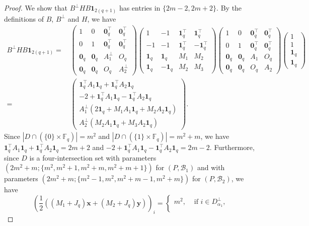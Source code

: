 \documentclass[10pt]{amsart}
\theoremstyle{definition}
\newcommand*\F{{\mathbb F}}
\newcommand*\tra{\top}
\newcommand*{\un}{\mathbf{1}}
\newcommand*{\bfx}{\mathbf{x}}
\newcommand*{\bfy}{\mathbf{y}}
\newcommand*{\bfo}{\mathbf{0}}
\begin{document}
\begin{proof}
We show that $B^\perp H B\un_{2(q+1)}$ has entries in $\{2m-2,2m+2\}$. By the definitions of $B$, $B^\perp$ and $H$, we have
\begin{align*}
B^\perp H B\un_{2(q+1)}=&\,
\begin{pmatrix} 1 &0 & \bfo_q^\tra& \bfo_q^\tra \\
0 &1 & \bfo_q^\tra& \bfo_q^\tra \\
\bfo_q &\bfo_q & A_1^\perp& O_q \\
\bfo_q & \bfo_q &O_q& A_2^\perp
\end{pmatrix}
\begin{pmatrix}
1 &-1 & \un_q^\tra& \un_q^\tra \\
-1 & -1 & \un_q^\tra&-\un_q^\tra \\
\un_q & \un_q &M_1 & M_2 \\
\un_q & -\un_q&M_2 & M_3
\end{pmatrix}
\begin{pmatrix} 1 &0 & \bfo_q^\tra& \bfo_q^\tra \\
0 &1 & \bfo_q^\tra& \bfo_q^\tra \\
\bfo_q &\bfo_q & A_1& O_q \\
\bfo_q & \bfo_q &O_q& A_2
\end{pmatrix}
\begin{pmatrix} 1\\1\\\un_q \\ \un_q
\end{pmatrix}\\
=&\,
\begin{pmatrix}
\un_q^\tra A_1 \un_q +\un_q^\tra A_2 \un_q\\
-2+\un_q^\tra A_1 \un_q -\un_q^\tra A_2 \un_q\\
A_1^\perp (2\un_q+M_1A_1\un_q+M_2A_2\un_q)\\
A_2^\perp (M_2A_1\un_q+M_3A_2\un_q)
\end{pmatrix}.
\end{align*}
Since $|D\cap (\{0\}\times \F_q)|=m^2$ and $|D\cap (\{1\}\times \F_q)|=m^2+m$, we have $\un_q^\tra A_1 \un_q +\un_q^\tra A_2 \un_q=2m+2$ and $-2+\un_q^\tra A_1 \un_q -\un_q^\tra A_2 \un_q=2m-2$. Furthermore, since $D$ is a four-intersection set with parameters $(2m^2+m;\{m^2,m^2+1,m^2+m,m^2+m+1\})$ for $(P,{\mathcal B}_1)$ and with parameters $(2m^2+m;\{m^2-1,m^2,m^2+m-1,m^2+m\})$ for $(P,{\mathcal B}_2)$, we have
\[
\left(\frac{1}{2}((M_1+J_q)\bfx+(M_2+J_q)\bfy)\right)_i=
\begin{cases}
m^2,& \text{ if } i\in D_{\alpha_1}^\perp,\\

\end{cases}\]
\end{proof}
\end{document}
